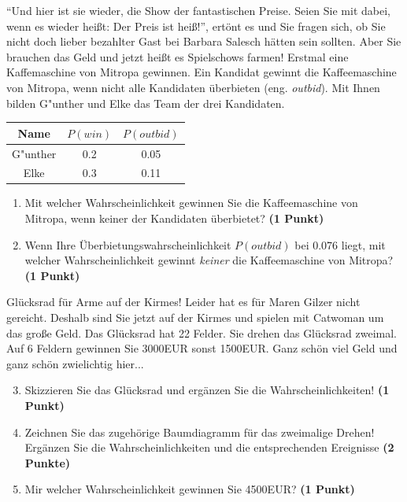 \documentclass[a4paper, 9pt]{scrartcl}\usepackage[]{graphicx}\usepackage[]{xcolor}
\begin{document}
"`Und hier ist sie wieder, die Show der fantastischen Preise. Seien Sie mit
dabei, wenn es wieder hei{\ss}t: Der Preis ist hei{\ss}!"', ert{\"o}nt es und Sie
fragen sich, ob Sie nicht doch lieber bezahlter Gast bei Barbara Salesch
h{\"a}tten sein sollten. Aber Sie brauchen das Geld und jetzt hei{\ss}t es
Spielschows farmen! Erstmal eine Kaffemaschine von Mitropa
gewinnen. Ein Kandidat gewinnt die Kaffeemaschine von Mitropa, wenn nicht alle
Kandidaten {\"u}berbieten (eng. \textit{outbid}). Mit Ihnen bilden
G{"u}nther und Elke das Team der drei Kandidaten.

\begin{center}
\begin{tabular}{ccc}
  \toprule
  Name & $P(win)$ & $P(outbid)$\\
  \midrule
  G{"u}nther & 0.2 & 0.05\\
  Elke & 0.3 & 0.11 \\
  \bottomrule
\end{tabular}
\end{center}

\begin{enumerate}
\item Mit welcher Wahrscheinlichkeit gewinnen Sie die Kaffeemaschine von
  Mitropa, wenn keiner der Kandidaten {\"u}berbietet? \textbf{(1 Punkt)}
\item Wenn Ihre {\"U}berbietungswahrscheinlichkeit $P(outbid)$ bei
  0.076 liegt, mit welcher Wahrscheinlichkeit gewinnt
  \textit{keiner} die Kaffeemaschine von Mitropa? \textbf{(1 Punkt)}
\end{enumerate}

Gl{\"u}cksrad f{\"u}r Arme auf der Kirmes! Leider hat es f{\"u}r Maren Gilzer nicht
gereicht. Deshalb sind Sie jetzt auf der Kirmes und spielen mit
Catwoman um das gro{\ss}e Geld. Das Gl{\"u}cksrad hat 22
Felder. Sie drehen das Gl{\"u}cksrad zweimal. Auf 6 Feldern
gewinnen Sie 3000EUR sonst 1500EUR. Ganz sch{\"o}n viel Geld
und ganz sch{\"o}n zwielichtig hier...

\begin{enumerate}
  \setcounter{enumi}{2}  
\item Skizzieren Sie das Gl{\"u}cksrad und erg{\"a}nzen Sie die
  Wahrscheinlichkeiten! \textbf{(1 Punkt)}
\item Zeichnen Sie das zugeh{\"o}rige Baumdiagramm f{\"u}r das zweimalige Drehen!
  Erg{\"a}nzen Sie die Wahrscheinlichkeiten und die entsprechenden Ereignisse
  \textbf{(2 Punkte)}
\item Mir welcher Wahrscheinlichkeit gewinnen Sie 4500EUR? \textbf{(1
    Punkt)}
\end{enumerate}
\end{document}

